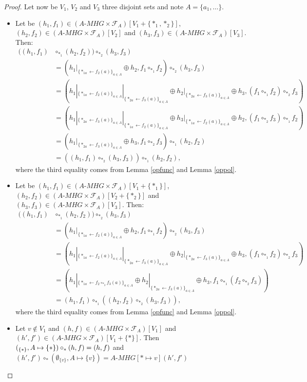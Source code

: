 \documentclass[a4paper]{article}
\theoremstyle{definition}
\begin{document}
\begin{proof}
Let now be $V_1$, $V_2$ and $V_3$ three disjoint sets and note $A=\{a_1,\dots\}$.
\begin{itemize}
\item Let be $(h_1,f_1)\in (A\text{-}MHG\times \mathcal{F}_A)[V_1+\{\ast_1,\ast_2\}]$,  $(h_2,f_2)\in (A\text{-}MHG\times \mathcal{F}_A)[V_2]$ and $(h_3,f_3)\in(A\text{-}MHG\times \mathcal{F}_A)[V_3]$. Then:
\begin{align*}
((h_1,f_1)&\circ_{\ast_1}(h_2,f_2))\circ_{\ast_2} (h_3,f_3) \\
&= (h_1|_{\{\ast_{1a}\leftarrow f_2(a)\}_{a\in A}}\oplus h_2, f_1\circ_{\ast_1}f_2)\circ_{\ast_2}(h_3,f_3) \\
&= (h_1|_{\{\ast_{1a}\leftarrow f_2(a)\}_{a\in A}}|_{\{\ast_{2a}\leftarrow f_3(a)\}_{a\in A}}\oplus h_2|_{\{\ast_{2a}\leftarrow f_3(a)\}_{a\in A}}\oplus h_3, (f_1\circ_{\ast_1}f_2)\circ_{\ast_2}f_3) \\
&= (h_1|_{\{\ast_{2a}\leftarrow f_3(a)\}_{a\in A}}|_{\{\ast_{1a}\leftarrow f_2(a)\}_{a\in A}}\oplus h_3|_{\{\ast_{1a}\leftarrow f_2(a)\}_{a\in A}}\oplus h_2, (f_1\circ_{\ast_2}f_3)\circ_{\ast_1}f_2) \\
&= (h_1|_{\{\ast_{2a}\leftarrow f_3(a)\}_{a\in A}}\oplus h_3, f_1\circ_{\ast_2}f_3)\circ_{\ast_1}(h_2,f_2) \\
&= ((h_1,f_1)\circ_{\ast_2}(h_3,f_3))\circ_{\ast_1} (h_2,f_2),
\end{align*}
where the third equality comes from Lemma \ref{opfunc} and Lemma \ref{oppol}.
\item Let be $(h_1,f_1)\in (A\text{-}MHG\times \mathcal{F}_A)[V_1+\{\ast_1\}]$,  $(h_2,f_2)\in (A\text{-}MHG\times \mathcal{F}_A)[V_2+\{\ast_2\}]$ and $(h_3,f_3)\in(A\text{-}MHG\times \mathcal{F}_A)[V_3]$. Then:
\begin{align*}
((h_1,f_1)&\circ_{\ast_1}(h_2,f_2))\circ_{\ast_2} (h_3,f_3) \\
&= (h_1|_{\{\ast_{1a}\leftarrow f_2(a)\}_{a\in A}}\oplus h_2, f_1\circ_{\ast_1}f_2)\circ_{\ast_2}(h_3,f_3) \\
&= (h_1|_{\{\ast_{1a}\leftarrow f_2(a)\}_{a\in A}}|_{\{\ast_{2a}\leftarrow f_3(a)\}_{a\in A}}\oplus h_2|_{\{\ast_{2a}\leftarrow f_3(a)\}_{a\in A}}\oplus h_3, (f_1\circ_{\ast_1}f_2)\circ_{\ast_2}f_3) \\
&= (h_1|_{\{\ast_{1a}\leftarrow f_2\circ_{\ast_2} f_3(a)\}_{a\in A}}\oplus h_2|_{\{\ast_{2a}\leftarrow f_3(a)\}_{a\in A}}\oplus h_3, f_1\circ_{\ast_1}(f_2\circ_{\ast_2}f_3)) \\
&= (h_1,f_1)\circ_{\ast_1}((h_2, f_2)\circ_{\ast_2}(h_3,f_3)),
\end{align*}
where the third equality comes from Lemma \ref{opfunc} and Lemma \ref{oppol}.
\item Let $v\not\in V_1$ and $(h,f)\in (A\text{-}MHG\times \mathcal{F}_A)[V_1]$ and $(h',f')\in (A\text{-}MHG\times \mathcal{F}_A)[V_1+\{\ast\}]$. Then $(\empty_{\{\ast\}},A\mapsto\{\ast\})\circ_{\ast} (h,f) = (h,f)$ and $(h',f')\circ_{\ast}(\emptyset_{\{v\}}, A\mapsto \{v\}) = A\text{-}MHG[\ast\mapsto v](h',f')$
\end{itemize}
\end{proof}
\end{document}
